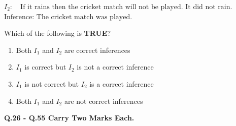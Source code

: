 \documentclass[journal]{IEEEtran}
\numberwithin{equation}{enumi}
\numberwithin{figure}{enumi}
\begin{document}
\begin{enumerate}
$I_2 : \quad \text{If it rains then the cricket match will not be played.} $
$\text{It did not rain.}$
$\text{Inference: The cricket match was played.}$

Which of the following is \textbf{TRUE}?
\begin{enumerate}
    \item Both $I_1$ and $I_2$ are correct inferences
    \item $I_1$ is correct but $I_2$ is not a correct inference
    \item $I_1$ is not correct but $I_2$ is a correct inference
    \item Both $I_1$ and $I_2$ are not correct inferences
\end{enumerate}


\begin{center}
 \textbf{Q.26 - Q.55 Carry Two Marks Each.}
\end{center}


\end{enumerate}
\end{document}
